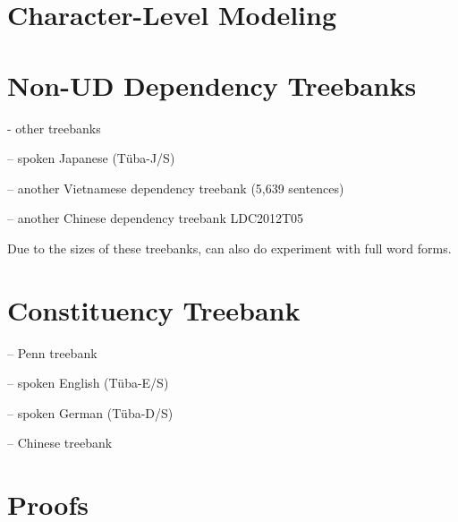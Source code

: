 \documentclass[11pt,letterpaper]{article}
\begin{document}
\section{Character-Level Modeling}

\section{Non-UD Dependency Treebanks}



- other treebanks



-- spoken Japanese (T{\"u}ba-J/S)

-- another Vietnamese dependency treebank \citep{nguyen-bktreebank:-2017} (5,639 sentences)


-- another Chinese dependency treebank LDC2012T05


Due to the sizes of these treebanks, can also do experiment with full word forms.


\section{Constituency Treebank}

-- Penn treebank \citep{marcus-building-1993}

-- spoken English (T{\"u}ba-E/S)

-- spoken German (T{\"u}ba-D/S)

-- Chinese treebank \citep{xue-chinese-2013}


\section{Proofs}
\end{document}
